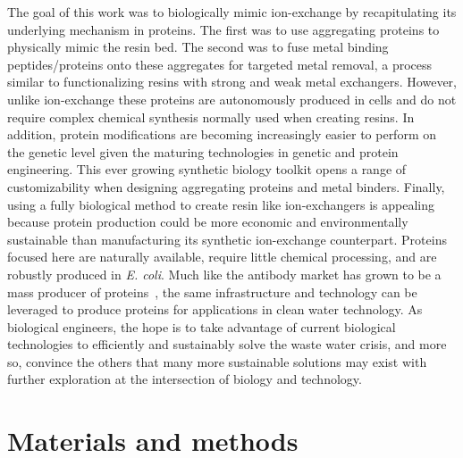 \documentclass[../main/main]{subfiles}
\begin{document}
The goal of this work was to biologically mimic ion-exchange by recapitulating its underlying mechanism in proteins. The first was to use aggregating proteins to physically mimic the resin bed. The second was to fuse metal binding peptides/proteins onto these aggregates for targeted metal removal, a process similar to functionalizing resins with strong and weak metal exchangers. However, unlike ion-exchange these proteins are autonomously produced in cells and do not require complex chemical synthesis normally used when creating resins. In addition, protein modifications are becoming increasingly easier to perform on the genetic level given the maturing technologies in genetic and protein engineering. This ever growing synthetic biology toolkit opens a range of customizability when designing aggregating proteins and metal binders. Finally, using a fully biological method to create resin like ion-exchangers is appealing because protein production could be more economic and environmentally sustainable than manufacturing its synthetic ion-exchange counterpart. Proteins focused here are naturally available, require little chemical processing, and are robustly produced in \textit{E. coli}. Much like the antibody market has grown to be a mass producer of proteins~\cite{kelley2009}, the same infrastructure and technology can be leveraged to produce proteins for applications in clean water technology. As biological engineers, the hope is to take advantage of current biological technologies to efficiently and sustainably solve the waste water crisis, and more so, convince the others that many more sustainable solutions may exist with further exploration at the intersection of biology and technology.

\section{Materials and methods}
\end{document}
